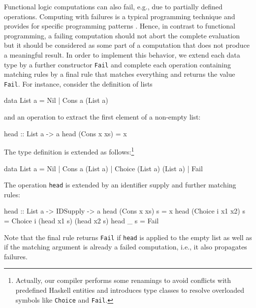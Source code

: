 \documentclass{llncs}
\newcommand{\code}[1]{\mbox{\small\texttt{#1}}}
\begin{document}
Functional logic computations can also fail, e.g.,
due to partially defined operations.
Computing with failures is a typical programming technique
and provides for specific programming patterns \cite{AntoyHanus02FLOPS}.
Hence, in contrast to functional programming,
a failing computation should not abort the complete evaluation
but it should be considered as some part of a computation that
does not produce a meaningful result.
In order to implement this behavior, we extend
each data type by a further constructor \code{Fail}
and complete each operation containing matching rules
by a final rule that matches everything and returns the value \code{Fail}.
For instance, consider the definition of lists
\begin{curry}
  data List a = Nil | Cons a (List a)
\end{curry}
and an operation to extract the first element of a non-empty list:
\begin{curry}
  head :: List a -> a
  head (Cons x xs) = x
\end{curry}
The type definition is extended as follows:\footnote{Actually,
our compiler performs some renamings to avoid conflicts with
predefined Haskell entities and introduces type classes
to resolve overloaded symbols like \code{Choice} and \code{Fail}.}
\begin{haskell}
  data List a = Nil | Cons a (List a) | Choice (List a) (List a) | Fail
\end{haskell}
The operation \code{head} is extended by an identifier supply
and further matching rules:
\begin{haskell}
  head :: List a -> IDSupply -> a
  head (Cons x xs)      s = x
  head (Choice i x1 x2) s = Choice i (head x1 s) (head x2 s)
  head _                s = Fail
\end{haskell}
Note that the final rule returns \code{Fail} if \code{head} is
applied to the empty list as well as if the matching argument
is already a failed computation, i.e., it also propagates failures.
\end{document}
